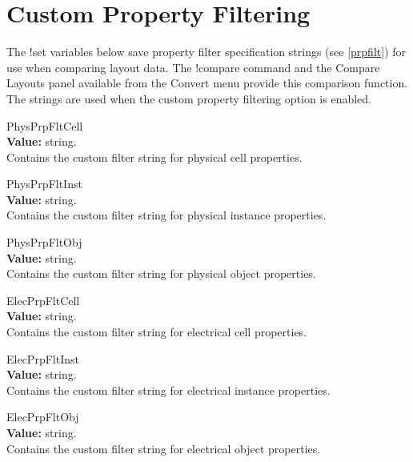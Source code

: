 \section{Custom Property Filtering}

The {\cb !set} variables below save property filter specification
strings (see \ref{prpfilt}) for use when comparing layout data.  The
{\cb !compare} command and the {\cb Compare Layouts} panel available
from the {\cb Convert} menu provide this comparison function.  The
strings are used when the custom property filtering option is enabled.

\begin{description}
\item{\et PhysPrpFltCell}\\
{\bf Value:} string.\\
Contains the custom filter string for physical cell properties.

\item{\et PhysPrpFltInst}\\
{\bf Value:} string.\\
Contains the custom filter string for physical instance properties.

\item{\et PhysPrpFltObj}\\
{\bf Value:} string.\\
Contains the custom filter string for physical object properties.

\item{\et ElecPrpFltCell}\\
{\bf Value:} string.\\
Contains the custom filter string for electrical cell properties.

\item{\et ElecPrpFltInst}\\
{\bf Value:} string.\\
Contains the custom filter string for electrical instance properties.

\item{\et ElecPrpFltObj}\\
{\bf Value:} string.\\
Contains the custom filter string for electrical object properties.
\end{description}


